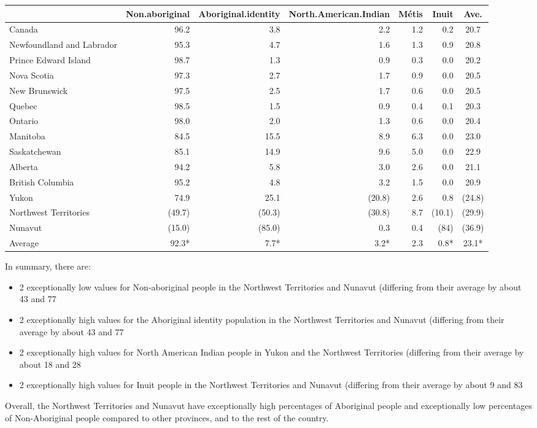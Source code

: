 \documentclass[9pt,letter]{article}
\begin{document}
\begin{longtable}[]{@{}lrrrrrc@{}}
\toprule
& Non.aboriginal & Aboriginal.identity & North.American.Indian & Métis &
Inuit & Ave.\tabularnewline
\midrule
\endhead
Canada & 96.2 & 3.8 & 2.2 & 1.2 & 0.2 & 20.7\tabularnewline
Newfoundland and Labrador & 95.3 & 4.7 & 1.6 & 1.3 & 0.9 &
20.8\tabularnewline
Prince Edward Island & 98.7 & 1.3 & 0.9 & 0.3 & 0.0 &
20.2\tabularnewline
Nova Scotia & 97.3 & 2.7 & 1.7 & 0.9 & 0.0 & 20.5\tabularnewline
New Brunswick & 97.5 & 2.5 & 1.7 & 0.6 & 0.0 & 20.5\tabularnewline
Quebec & 98.5 & 1.5 & 0.9 & 0.4 & 0.1 & 20.3\tabularnewline
Ontario & 98.0 & 2.0 & 1.3 & 0.6 & 0.0 & 20.4\tabularnewline
Manitoba & 84.5 & 15.5 & 8.9 & 6.3 & 0.0 & 23.0\tabularnewline
Saskatchewan & 85.1 & 14.9 & 9.6 & 5.0 & 0.0 & 22.9\tabularnewline
Alberta & 94.2 & 5.8 & 3.0 & 2.6 & 0.0 & 21.1\tabularnewline
British Columbia & 95.2 & 4.8 & 3.2 & 1.5 & 0.0 & 20.9\tabularnewline
Yukon & 74.9 & 25.1 & (20.8) & 2.6 & 0.8 & (24.8)\tabularnewline
Northwest Territories & (49.7) & (50.3) & (30.8) & 8.7 & (10.1) &
(29.9)\tabularnewline
Nunavut & (15.0) & (85.0) & 0.3 & 0.4 & (84) & (36.9)\tabularnewline
Average & 92.3* & 7.7* & 3.2* & 2.3 & 0.8* & 23.1*\tabularnewline
\bottomrule
\end{longtable}

In summary, there are:

\begin{itemize}
  \item 2 exceptionally low values for Non-aboriginal people in the Northwest Territories and Nunavut (differing from their average by about 43 and 77%
  \item 2 exceptionally high values for the Aboriginal identity population in the Northwest Territories and Nunavut (differing from their average by about 43 and 77%
  \item 2 exceptionally high values for North American Indian people in Yukon and the Northwest Territories (differing from their average by about 18 and 28%
  \item 2 exceptionally high values for Inuit people in the Northwest Territories and Nunavut (differing from their average by about 9 and 83%
\end{itemize}

Overall, the Northwest Territories and Nunavut have exceptionally high
percentages of Aboriginal people and exceptionally low percentages of
Non-Aboriginal people compared to other provinces, and to the rest of
the country.\vspace{5mm}
\end{document}
